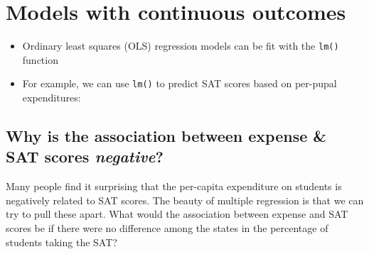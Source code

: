 \documentclass[]{book}
\newenvironment{Shaded}{\begin{snugshade}}{\end{snugshade}}
\newcommand{\KeywordTok}[1]{\textcolor[rgb]{0.13,0.29,0.53}{\textbf{#1}}}
\newcommand{\DataTypeTok}[1]{\textcolor[rgb]{0.13,0.29,0.53}{#1}}
\newcommand{\StringTok}[1]{\textcolor[rgb]{0.31,0.60,0.02}{#1}}
\newcommand{\CommentTok}[1]{\textcolor[rgb]{0.56,0.35,0.01}{\textit{#1}}}
\newcommand{\OperatorTok}[1]{\textcolor[rgb]{0.81,0.36,0.00}{\textbf{#1}}}
\newcommand{\NormalTok}[1]{#1}
\providecommand{\tightlist}{%
  \setlength{\itemsep}{0pt}\setlength{\parskip}{0pt}}
\begin{document}
\section{Models with continuous
outcomes}\label{models-with-continuous-outcomes}

\begin{itemize}
\tightlist
\item
  Ordinary least squares (OLS) regression models can be fit with the
  \texttt{lm()} function
\item
  For example, we can use \texttt{lm()} to predict SAT scores based on
  per-pupal expenditures:
\end{itemize}

\begin{Shaded}
\end{Shaded}

\subsection{\texorpdfstring{Why is the association between expense \&
SAT scores
\emph{negative}?}{Why is the association between expense \& SAT scores negative?}}\label{why-is-the-association-between-expense-sat-scores-negative}

Many people find it surprising that the per-capita expenditure on
students is negatively related to SAT scores. The beauty of multiple
regression is that we can try to pull these apart. What would the
association between expense and SAT scores be if there were no
difference among the states in the percentage of students taking the
SAT?

\begin{Shaded}
\end{Shaded}
\end{document}
